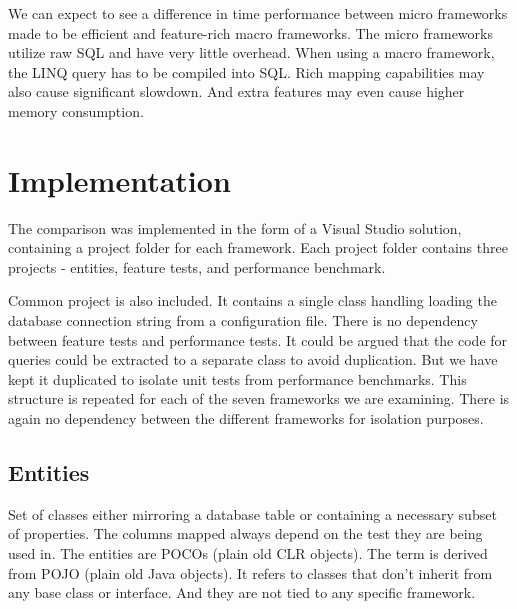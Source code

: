We can expect to see a difference in time performance between micro frameworks made to be efficient and feature-rich macro frameworks.
The micro frameworks utilize raw SQL and have very little overhead. When using a macro framework, the LINQ query has to be compiled into SQL. Rich mapping capabilities may also cause significant slowdown. And extra features may even cause higher memory consumption.

\section{Implementation}
The comparison was implemented in the form of a Visual Studio solution, containing a project folder for each framework. Each project folder contains three projects - entities, feature tests, and performance benchmark. 


\usetikzlibrary{positioning, arrows}
\begin{center}
\end{center}

Common project is also included. It contains a single class handling loading the database connection string from a configuration file. There is no dependency between feature tests and performance tests. It could be argued that the code for queries could be extracted to a separate class to avoid duplication. But we have kept it duplicated to isolate unit tests from performance benchmarks. This structure is repeated for each of the seven frameworks we are examining. There is again no dependency between the different frameworks for isolation purposes.

\subsection{Entities}
Set of classes either mirroring a database table or containing a necessary subset of properties. The columns mapped always depend on the test they are being used in. The entities are POCOs (plain old CLR objects). The term is derived from POJO (plain old Java objects). \cite{Fowler2003POJO} It refers to classes that don't inherit from any base class or interface. And they are not tied to any specific framework.

